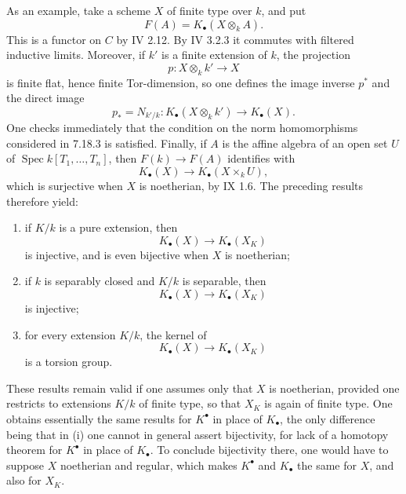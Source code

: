 \documentclass[11pt]{article}
\newcommand{\Gr}{\operatorname{Gr}}
\newcommand{\Spec}{\operatorname{Spec}}
\providecommand{\Pic}{\operatorname{Pic}}
\providecommand{\GL}{\operatorname{GL}}
\providecommand{\Gr}{\operatorname{Gr}}
\providecommand{\Coker}{\operatorname{Coker}}
\providecommand{\Supp}{\operatorname{Supp}}
\providecommand{\Gr}{\operatorname{G}}
\begin{document}
As an example, take a scheme \(X\) of finite type over \(k\), and put
\[
  F(A)=K_\bullet(X\otimes_k A).
\]
This is a functor on \(C\) by IV 2.12. By IV 3.2.3 it commutes with filtered inductive limits. Moreover, if \(k'\) is a finite extension of \(k\), the projection
\[
  p:X\otimes_k k'\longrightarrow X
\]
is finite flat, hence finite Tor-dimension, so one defines the image inverse \(p^*\) and the direct image
\[
  p_*=N_{k'/k}:K_\bullet(X\otimes_k k')\longrightarrow K_\bullet(X).
\]
One checks immediately that the condition on the norm homomorphisms considered in 7.18.3 is satisfied. Finally, if \(A\) is the affine algebra of an open set \(U\) of \(\Spec k[T_1,\ldots,T_n]\), then \(F(k)\to F(A)\) identifies with
\[
  K_\bullet(X)\longrightarrow K_\bullet(X\times_k U),
\]
which is surjective when \(X\) is noetherian, by IX 1.6. The preceding results therefore yield:
\begin{enumerate}[label=(\roman*)]
\item if \(K/k\) is a pure extension, then
\[
  K_\bullet(X)\longrightarrow K_\bullet(X_K)
\]
is injective, and is even bijective when \(X\) is noetherian;
\item if \(k\) is separably closed and \(K/k\) is separable, then
\[
  K_\bullet(X)\longrightarrow K_\bullet(X_K)
\]
is injective;
\item for every extension \(K/k\), the kernel of
\[
  K_\bullet(X)\longrightarrow K_\bullet(X_K)
\]
is a torsion group.
\end{enumerate}
These results remain valid if one assumes only that \(X\) is noetherian, provided one restricts to extensions \(K/k\) of finite type, so that \(X_K\) is again of finite type. One obtains essentially the same results for \(K^\bullet\) in place of \(K_\bullet\), the only difference being that in (i) one cannot in general assert bijectivity, for lack of a homotopy theorem for \(K^\bullet\) in place of \(K_\bullet\). To conclude bijectivity there, one would have to suppose \(X\) noetherian and regular, which makes \(K^\bullet\) and \(K_\bullet\) the same for \(X\), and also for \(X_K\).



\providecommand{\Isom}{\operatorname{Isom}}
\providecommand{\Hom}{\operatorname{Hom}}
\providecommand{\Coker}{\operatorname{Coker}}
\providecommand{\red}{\operatorname{red}}
\providecommand{\Nil}{\operatorname{Nil}}
\providecommand{\im}{\operatorname{Im}}
\providecommand{\coker}{\operatorname{coker}}
\providecommand{\Supp}{\operatorname{Supp}}
\providecommand{\fppf}{\mathrm{fppf}}
\providecommand{\zar}{\mathrm{zar}}
\providecommand{\GL}{\operatorname{GL}}
\providecommand{\Gr}{\operatorname{Gr}}
\providecommand{\Pic}{\operatorname{Pic}}
\providecommand{\Spec}{\operatorname{Spec}}
\providecommand{\V}{\operatorname{V}}
\providecommand{\Ass}{\operatorname{Ass}}
\end{document}
